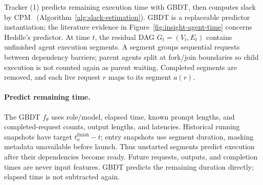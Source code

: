 Tracker (1) predicts remaining execution time with GBDT, then computes
slack by CPM~\cite{kelley1959cpm} (Algorithm~\ref{alg:slack-estimation}).
GBDT is a replaceable predictor instantiation; the literature evidence
in Figure~\ref{fig:insight-agent-time} concerns Heddle's predictor.
At time $t$, the residual DAG $G_t=(V_t,E_t)$ contains unfinished agent
execution segments. A segment groups sequential requests between
dependency barriers; parent agents split at fork/join boundaries so
child execution is not counted again as parent waiting. Completed
segments are removed, and each live request $r$ maps to its segment $a(r)$.

\paragraph{Predict remaining time.}
The GBDT $f_\theta$ uses role/model, elapsed time, known prompt lengths,
and completed-request counts, output lengths, and latencies.
Historical running snapshots have target $t_a^{\mathrm{finish}}-t$;
entry snapshots use segment duration, masking metadata unavailable
before launch. Thus unstarted segments predict execution after their
dependencies become ready. Future requests, outputs, and completion
times are never input features. GBDT predicts the remaining duration
directly; elapsed time is not subtracted again.

